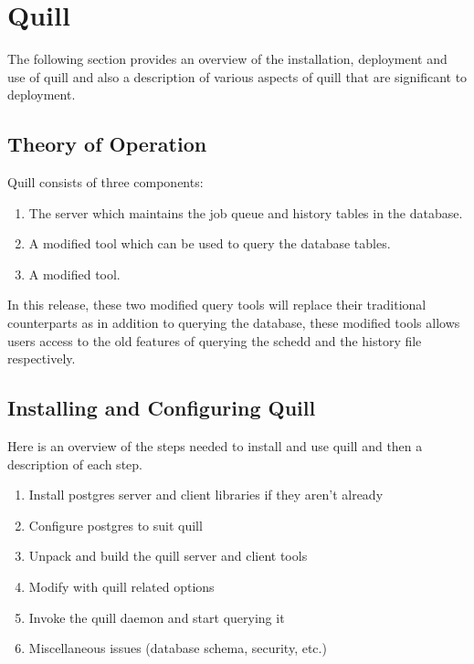 \section{\label{sec:Quill}Quill}

The following section provides an overview of the installation, deployment
and use of quill and also a description of various aspects of quill that
are significant to deployment.

\subsection{\label{sec:Quill-TOE}Theory of Operation}
Quill consists of three components: 

\begin{enumerate}
\item The  server which maintains the job queue and history
tables in the database.

\item A modified  tool which can be used to query the database
tables.

\item A modified  tool.

\end{enumerate}

In this release, these two modified query tools will replace their traditional 
counterparts as in addition to querying the database, these modified tools allows
users access to the old features of querying the schedd and the history file 
respectively.

\subsection{\label{sec:Quill-Installation}Installing and Configuring Quill}

Here is an overview of the steps needed to install and use quill and then
a description of each step.

\begin{enumerate}
\item Install postgres server and client libraries if they aren't already
\item Configure postgres to suit quill
\item Unpack and build the quill server and client tools
\item Modify  with quill related options
\item Invoke the quill daemon and start querying it
\item Miscellaneous issues (database schema, security, etc.)
\end{enumerate}


